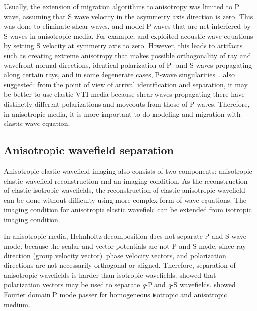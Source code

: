 Usually, the extension of migration algorithms to anisotropy was limited to P wave, assuming that S wave velocity in the asymmetry axis direction is zero. This was done to eliminate shear waves, and model P waves that are not interfered by S waves in anisotropic media. For example, \cite{alkhalifah:623} and \cite{alkhalifah:1239} exploited acoustic wave equations by setting S velocity at symmetry axis to zero. However, this leads to artifacts such as creating extreme anisotropy that makes possible orthogonality of ray and wavefront normal directions, identical polarization of P- and S-waves propagating along certain rays, and in some degenerate cases, P-wave singularities~\cite[]{grechka:576}. \cite{grechka:576} also suggested: from the point of view of arrival identification and separation, it may be better to use elastic VTI media because shear-waves propagating there have distinctly different polarizations and moveouts from those of P-waves. Therefore, in anisotropic media, it is more important to do modeling and migration with elastic wave equation.

\subsection{Anisotropic wavefield separation}

Anisotropic elastic wavefield imaging also consists of two components: anisotropic elastic wavefield reconstruction and an imaging condition. As the reconstruction of elastic isotropic wavefields, the reconstruction of elastic anisotropic wavefield can be done without difficulty using more complex form of wave equations. The imaging condition for anisotropic elastic wavefield can be extended from isotropic imaging condition. 

In anisotropic media, Helmholtz decomposition does not separate P and S wave mode, because the scalar and vector potentials are not P and S mode, since ray direction (group velocity vector), phase velocity vectors, and polarization directions are not necessarily orthogonal or aligned. Therefore, separation of anisotropic wavefields is harder than isotropic wavefields. \cite{GEO55-07-09140919} showed that polarization vectors may be used to separate \textit q-P and \textit q-S wavefields.  showed Fourier domain P mode passer for homogeneous isotropic and anisotropic medium.




